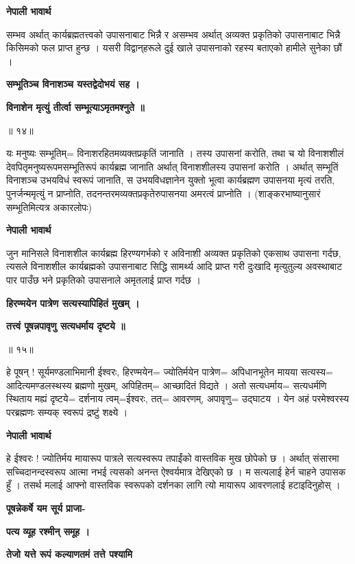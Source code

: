 \documentclass[11pt, a5paper]{article}
\begin{document}
\textbf{नेपाली भावार्थ}

सम्भव अर्थात् कार्यब्रह्मतत्त्वको उपासनाबाट भिन्नै र असम्भव अर्थात् अव्यक्त प्रकृतिको उपासनाबाट भिन्नै किसिमको फल प्राप्त हुन्छ । यसरी विद्वान्‌हरूले दुई खाले उपासनाको रहस्य बताएको हामीले सुनेका छौं ।

\textbf{सम्भूतिञ्च विनाशञ्च यस्तद्वेदोभयं सह ।}

\textbf{विनाशेन मृत्युं तीर्त्वा सम्भूत्याऽमृतमश्नुते ॥}

॥ १४॥

यः मनुष्यः सम्भूतिम्= विनाशरहितमव्यक्तप्रकृतिं जानाति । तस्य उपासनां करोति, तथा च यो विनाशशीलं देवपितृमनुष्यरूपमसम्भूतिरूपं कार्यब्रह्म जानाति अर्थात् विनाशशीलस्य उपासनां करोति  । अर्थात् सम्भूतिं विनाशञ्च उभयविधं स्वरूपं जानाति, स उभयविधज्ञानेन युक्तो भूत्वा कार्यब्रह्मण उपासनया मृत्यं तरति, पुनर्जन्ममृत्युं न प्राप्नोति, तदनन्तरमव्यक्तप्रकृतेरुपासनया अमरत्वं प्राप्नोति । (शाङ्करभाष्यानुसारं सम्भूतिमित्यत्र अकारलोपः)

\textbf{नेपाली भावार्थ}

जुन मानिसले विनाशशील कार्यब्रह्म हिरण्यगर्भको र अविनाशी अव्यक्त प्रकृतिको एकसाथ उपासना गर्दछ, त्यसले विनाशशील कार्यब्रह्मको उपासनाबाट सिद्धि सामर्थ्य आदि प्राप्त गरी दुःखादि मृत्युतुल्य अवस्थाबाट पार पाउँछ भने प्रकृतिको उपासनाले अमृतलाई प्राप्त गर्दछ ।

\textbf{हिरण्मयेन पात्रेण सत्यस्यापिहितं मुखम् ।}

\textbf{तत्त्वं पूषन्नपावृणु सत्यधर्माय दृष्टये ॥}

॥ १५॥

हे पूषन् ! सूर्यमण्डलाभिमानी ईश्वरः, हिरण्मयेन= ज्योतिर्मयेन पात्रेण= अपिधानभूतेन मायया सत्यस्य= आदित्यमण्डलस्थस्य ब्रह्मणो मुखम्, अपिहितम्= आच्छादितं विद्यते । अतो  सत्यधर्माय= सत्यधर्मणि स्थिताय मह्यं दृष्टये= दर्शनाय त्वम्=ईश्वरः, तत्= आवरणम्, अपावृणु= उद्‌घाटय । येन अहं परमेश्वरस्य परब्रह्मणः सम्यक् स्वरूपं द्रष्टुं शक्ष्ये ।

\textbf{नेपाली भावार्थ}

हे ईश्वरः ! ज्योतिर्मय मायारूप पात्रले सत्यस्वरूप तपाईंको वास्तविक मुख छोपेको छ । अर्थात् संसारमा सच्चिदानन्दस्वरूप आत्मा नभई त्यसको अनन्त ऐश्वर्यमात्र देखिएको छ । म सत्यलाई हेर्न चाहने उपासक हुँ । तसर्थ मलाई आफ्नो वास्तविक स्वरूपको दर्शनका लागि त्यो मायारूप आवरणलाई हटाइदिनुहोस् ।

\textbf{पूषन्नेकर्षे यम सूर्य प्राजा-}

\textbf{पत्य व्यूह रश्मीन् समूह ।}

\textbf{तेजो यत्ते रूपं कल्याणतमं तत्ते पश्यामि}
\end{document}
